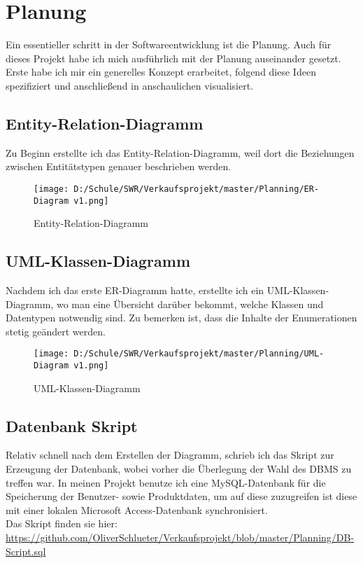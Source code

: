 \chapter{Planung}

Ein essentieller schritt in der Softwareentwicklung ist die Planung. Auch für dieses Projekt habe ich mich ausführlich mit der Planung auseinander gesetzt. Erste habe ich mir ein generelles Konzept erarbeitet, folgend diese Ideen spezifiziert und anschließend in anschaulichen visualisiert.

\section{Entity-Relation-Diagramm}
Zu Beginn erstellte ich das Entity-Relation-Diagramm, weil dort die Beziehungen zwischen Entitätstypen genauer beschrieben werden. 

\begin{figure}[h]
\texttt{[image: D:/Schule/SWR/Verkaufsprojekt/master/Planning/ER-Diagram v1.png]}
\caption{Entity-Relation-Diagramm}
\end{figure}

\section{UML-Klassen-Diagramm}

Nachdem ich das erste ER-Diagramm hatte, erstellte ich ein UML-Klassen-Diagramm, wo man eine Übersicht darüber bekommt, welche Klassen und Datentypen notwendig sind. Zu bemerken ist, dass die Inhalte der Enumerationen stetig geändert werden.

\begin{figure}[h]
\texttt{[image: D:/Schule/SWR/Verkaufsprojekt/master/Planning/UML-Diagram v1.png]}
\caption{UML-Klassen-Diagramm}
\end{figure}

\section{Datenbank Skript}
Relativ schnell nach dem Erstellen der Diagramm, schrieb ich das Skript zur Erzeugung der Datenbank, wobei vorher die Überlegung der Wahl des DBMS zu treffen war. In meinen Projekt benutze ich eine MySQL-Datenbank für die Speicherung der Benutzer- sowie Produktdaten, um auf diese zuzugreifen ist diese mit einer lokalen Microsoft Access-Datenbank synchronisiert.\\
Das Skript finden sie hier: \url{https://github.com/OliverSchlueter/Verkaufsprojekt/blob/master/Planning/DB-Script.sql}